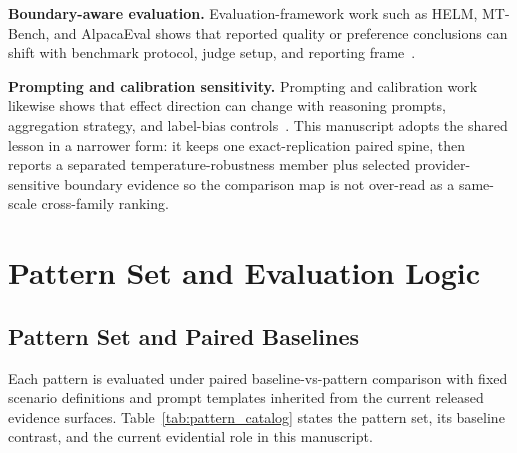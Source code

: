 \documentclass[11pt,a4paper]{article}
\begin{document}
\textbf{Boundary-aware evaluation.}
Evaluation-framework work such as HELM, MT-Bench, and AlpacaEval shows that reported quality or preference conclusions can shift with benchmark protocol, judge setup, and reporting frame~\cite{liang2022helm,zheng2023mtbench,dubois2024alpacaeval}.

\textbf{Prompting and calibration sensitivity.}
Prompting and calibration work likewise shows that effect direction can change with reasoning prompts, aggregation strategy, and label-bias controls~\cite{kojima2022zeroshot,wang2023selfconsistency,zhao2021calibrate}. This manuscript adopts the shared lesson in a narrower form: it keeps one exact-replication paired spine, then reports a separated temperature-robustness member plus selected provider-sensitive boundary evidence so the comparison map is not over-read as a same-scale cross-family ranking.

\section{Pattern Set and Evaluation Logic}
\label{sec:method}

\subsection{Pattern Set and Paired Baselines}

Each pattern is evaluated under paired baseline-vs-pattern comparison with fixed scenario definitions and prompt templates inherited from the current released evidence surfaces. Table~\ref{tab:pattern_catalog} states the pattern set, its baseline contrast, and the current evidential role in this manuscript.
\end{document}
